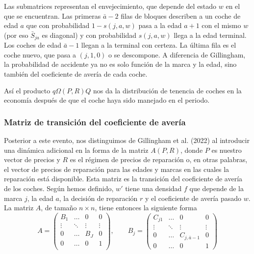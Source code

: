 \documentclass{article}
\begin{document}
Las submatrices representan el envejecimiento, que depende del estado $w$ en el que se encuentran. Las primeras $\bar{a}-2$ filas de bloques describen a un coche de edad $a$ que con probabilidad $1-s(j,a,w)$ pasa a la edad $a+1$ con el mismo $w$ (por eso $\bar{S}_{ja}$ es diagonal) y con probabilidad $s(j,a,w)$ llega a la edad terminal. Los coches de edad $\bar{a}-1$ llegan a la terminal con certeza. La última fila es el coche nuevo, que pasa a $(j,1,0)$ o se descompone. A diferencia de Gillingham, la probabilidad de accidente ya no es solo función de la marca y la edad, sino también del coeficiente de avería de cada coche.

Así el producto $q\Omega(P,R)Q$ nos da la distribución de tenencia de coches en la economía después de que el coche haya sido manejado en el periodo.



\subsubsection{Matriz de transición del coeficiente de avería}


Posterior a este evento, nos distinguimos de Gillingham et al. (2022) al introducir una dinámica adicional en la forma de la matriz $A(P, R)$, donde $P$ es nuestro vector de precios y $R$ es el régimen de precios de reparación o, en otras palabras, el vector de precios de reparación para las edades y marcas en las cuales la reparación está disponible. Esta matriz es la transición del coeficiente de avería de los coches. Según hemos definido, $w'$ tiene una densidad $f$ que depende de la marca $j$, la edad $a$, la decisión de reparación $r$ y el coeficiente de avería pasado $w$. La matriz $A$, de tamaño $n\times n$, tiene entonces la siguiente forma
$$A=
\begin{pmatrix}
    B_1 & \dots & 0 & 0 \\
    \vdots & \ddots& \vdots & \vdots \\
    0 & \dots & B_J & 0 \\
    0 & \dots & 0 & 1 \\
\end{pmatrix},
\qquad
B_j=
\begin{pmatrix}
    C_{j1} & \dots & 0 & 0 \\
    \vdots & \ddots & \vdots & \vdots \\
    0 & \dots & C_{j,\bar{a}-1} & 0\\
    0 & \dots & 0 & 1
\end{pmatrix}
$$
\end{document}
